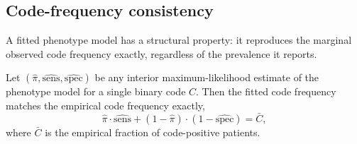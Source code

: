 \subsection{Code-frequency consistency}

A fitted phenotype model has a structural property: it reproduces the
marginal observed code frequency exactly, regardless of the prevalence
it reports.

\begin{theorem}
\label{thm:code-total}
Let $(\hat\pi, \widehat{\mathrm{sens}}, \widehat{\mathrm{spec}})$ be any
interior maximum-likelihood estimate of the phenotype model for a
single binary code $C$. Then the fitted code frequency matches the
empirical code frequency exactly,
\begin{equation}
  \hat\pi \cdot \widehat{\mathrm{sens}}
    + (1 - \hat\pi)\cdot(1 - \widehat{\mathrm{spec}})
    = \bar{C},
  \label{eq:code-total}
\end{equation}
where $\bar{C}$ is the empirical fraction of code-positive patients.
\end{theorem}

